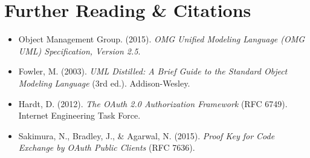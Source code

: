 \section{Further Reading \protect\& Citations}
\begin{itemize}[leftmargin=18pt]
  \item Object Management Group. (2015). \textit{OMG Unified Modeling Language (OMG UML) Specification, Version 2.5}.
  \item Fowler, M. (2003). \textit{UML Distilled: A Brief Guide to the Standard Object Modeling Language} (3rd ed.). Addison-Wesley.
  \item Hardt, D. (2012). \textit{The OAuth 2.0 Authorization Framework} (RFC 6749). Internet Engineering Task Force.
  \item Sakimura, N., Bradley, J., \& Agarwal, N. (2015). \textit{Proof Key for Code Exchange by OAuth Public Clients} (RFC 7636).
\end{itemize}
